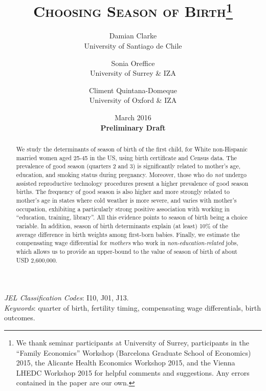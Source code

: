\documentclass[a4paper, 12 pt]{article}
\theoremstyle{plain}
\begin{document}
\title{\Large{\textsc{Choosing Season of Birth}}\thanks{\scriptsize{We thank seminar participants at University of Surrey, participants in the ``Family Economics'' Workshop (Barcelona Graduate School of Economics) 2015, the Alicante Health Economics Workshop 2015, and the Vienna LHEDC Workshop 2015 for helpful comments and suggestions. Any errors contained in the paper are our own.}}}
\author{\small{Damian Clarke} \\ \small{University of Santiago de Chile} \and \small{Sonia Oreffice} \\ \small{University of Surrey \& IZA}  \and \small{Climent Quintana-Domeque} \\ \small{University of Oxford \& IZA}}

\date{{\small March 2016} \\ \vspace{2mm} \small{\textbf{Preliminary Draft}}}




\maketitle
\thispagestyle{empty}

\begin{abstract}
We study the determinants of season of birth of the first child, for White non-Hispanic married women aged 25-45 in the US, using birth certificate and Census data. The prevalence of good season (quarters 2 and 3) is significantly related to mother's age, education, and smoking status during pregnancy. Moreover, those who do \emph{not} undergo assisted reproductive technology procedures present a higher prevalence of good season births. The frequency of good season is also higher and more strongly related to mother's age in states where cold weather is more severe, and varies with mother's occupation, exhibiting a particularly strong positive association with working in ``education, training, library''. All this evidence points to season of birth being a choice variable. In addition, season of birth determinants explain (at least) 10\% of the average difference in birth weights among first-born babies. Finally, we estimate the compensating wage differential for \emph{mothers} who work in \emph{non-education-related} jobs, which allows us to provide an upper-bound to the value of season of birth of about USD 2,600,000.
\end{abstract}
\emph{JEL Classification Codes}: I10, J01, J13.\\
\emph{Keywords}: quarter of birth, fertility timing, compensating wage differentials, birth outcomes.
\end{document}
